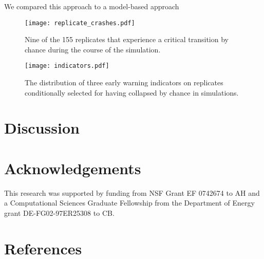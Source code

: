\documentclass[authoryear,preprint,11pt]{elsarticle}
\begin{document}
We compared this approach to a model-based approach 


  \begin{figure}[ht]
    \begin{center}
      \texttt{[image: replicate\_crashes.pdf]}
    \end{center}
    \caption{Nine of the 155 replicates that experience a critical transition by chance during the course of the simulation.}
    \label{fig:replicate_crashes}
  \end{figure}


  \begin{figure}[ht]
    \begin{center}
      \texttt{[image: indicators.pdf]}
    \end{center}
    \caption{The distribution of three early warning indicators on replicates conditionally selected for having collapsed by chance in simulations.}
    \label{fig:indicator}
  \end{figure}

 \section{Discussion}

 \section{Acknowledgements}
This research was supported by funding from NSF Grant EF 0742674 to AH
and a Computational Sciences Graduate Fellowship from the Department of Energy grant DE-FG02-97ER25308 to CB. 
 \section{References}%
 
 
\end{document}
